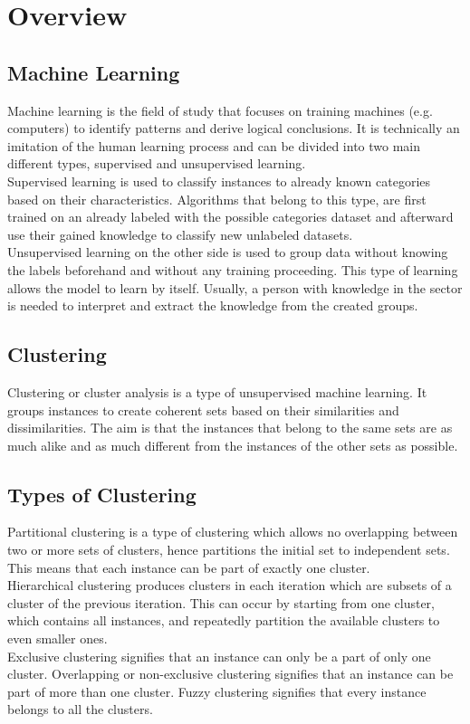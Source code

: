 \section{Overview}

\subsection{Machine Learning}
Machine learning is the field of study that focuses on training machines (e.g. computers) to identify patterns and derive logical conclusions. It is technically an imitation of the human learning process and can be divided into two main different types, supervised and unsupervised learning. \autocite{machDef} \\
Supervised learning is used to classify instances to already known categories based on their characteristics. Algorithms that belong to this type, are first trained on an already labeled with the possible categories dataset and afterward use their gained knowledge to classify new unlabeled datasets. \\
Unsupervised learning on the other side is used to group data without knowing the labels beforehand and without any training proceeding. This type of learning allows the model to learn by itself. Usually, a person with knowledge in the sector is needed to interpret and extract the knowledge from the created groups. \\

\subsection{Clustering}
Clustering or cluster analysis is a type of unsupervised machine learning. It groups instances to create coherent sets based on their similarities and dissimilarities. The aim is that the instances that belong to the same sets are as much alike and as much different from the instances of the other sets as possible.

\subsection{Types of Clustering}
Partitional clustering is a type of clustering which allows no overlapping between two or more sets of clusters, hence partitions the initial set to independent sets. This means that each instance can be part of exactly one cluster. \\
Hierarchical clustering produces clusters in each iteration which are subsets of a cluster of the previous iteration. This can occur by starting from one cluster, which contains all instances, and repeatedly partition the available clusters to even smaller ones. \\
Exclusive clustering signifies that an instance can only be a part of only one cluster.
Overlapping or non-exclusive clustering signifies that an instance can be part of more than one cluster.
Fuzzy clustering signifies that every instance belongs to all the clusters. \autocite{tanSteinKum}


